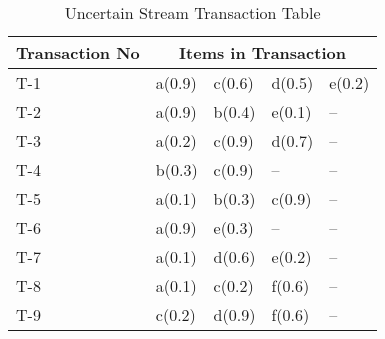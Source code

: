 \documentclass{article}
\begin{document}
\begin{table}
\centering

\begin{tabular}{|l||l|l|l|l|}


\hline
Transaction No & \multicolumn{4}{|c|}{Items in Transaction} \\ \hline \hline
T-1 & a(0.9) & c(0.6) & d(0.5) & e(0.2)\\ \hline
T-2 & a(0.9) & b(0.4) & e(0.1) & --    \\ \hline
T-3 & a(0.2) & c(0.9) & d(0.7) & --    \\ \hline
T-4 & b(0.3) & c(0.9) & -- & --        \\ \hline
T-5 & a(0.1) & b(0.3) & c(0.9) & --    \\ \hline
T-6 & a(0.9) & e(0.3) & -- & --        \\ \hline
T-7 & a(0.1) & d(0.6) & e(0.2) & --    \\ \hline
T-8 & a(0.1) & c(0.2) & f(0.6) & --    \\ \hline
T-9 & c(0.2) & d(0.9) & f(0.6) & --    \\ \hline
\end{tabular}
\caption{Uncertain Stream Transaction Table}

\end{table}
\end{document}
